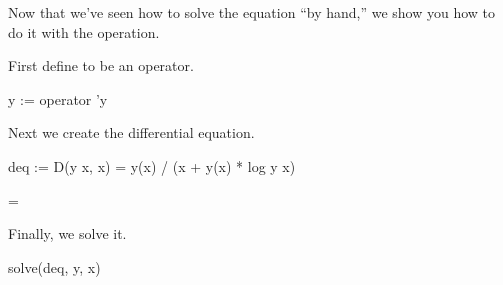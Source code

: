 {{{{{{{{{{{{{{{{Now that we've seen how to solve the equation ``by hand,''
we show you how to do it with the  operation.
\begin{xtc}
\begin{xtccomment}
First define  to be an operator.
\end{xtccomment}
\begin{spadsrc}
y := operator 'y 
\end{spadsrc}
\begin{TeXOutput}
\begin{fricasmath}{18}
%
\end{fricasmath}
\end{TeXOutput}
\end{xtc}
\begin{xtc}
\begin{xtccomment}
Next we create the differential equation.
\end{xtccomment}
\begin{spadsrc}
deq := D(y x, x) = y(x) / (x + y(x) * log y x) 
\end{spadsrc}
\begin{TeXOutput}
\begin{fricasmath}{19}
=%
\end{fricasmath}
\end{TeXOutput}
\end{xtc}
\begin{xtc}
\begin{xtccomment}
Finally, we solve it.
\end{xtccomment}
\begin{spadsrc}
solve(deq, y, x) 
\end{spadsrc}
\begin{TeXOutput}
\begin{fricasmath}{20}
%
\end{fricasmath}
\end{TeXOutput}
\end{xtc}


}}}}}}}}}}}}}}}}
